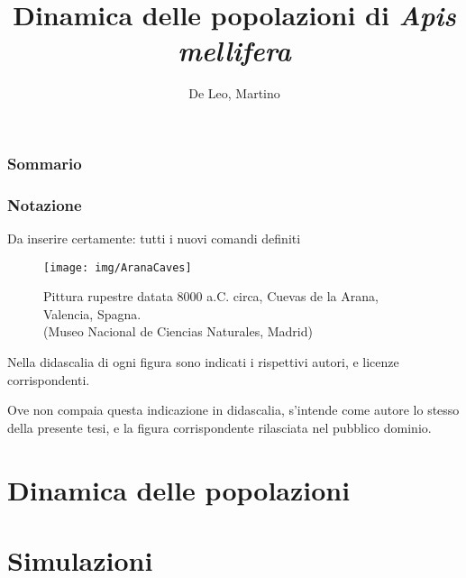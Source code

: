 \documentclass[12pt,a4paper,oneside,hidelinks]{book} %
\author{De Leo, Martino}
\title{Dinamica delle popolazioni di \emph{Apis mellifera} }
\begin{document}
\maketitle %

\frontmatter

\section*{Sommario}


\section*{Notazione}
Da inserire certamente: tutti i nuovi comandi definiti

\begin{figure}[hbp]
    \centering
    \texttt{[image: img/AranaCaves]}

    \caption[Pittura rupestre di Arana.]{Pittura rupestre datata 8000 a.C. circa, Cuevas de la Arana, Valencia, Spagna. \\ (Museo Nacional de Ciencias Naturales, Madrid)}
    \label{img:arana}
\end{figure}

\cleardoublepage
\tableofcontents

\listoffigures
Nella didascalia di ogni figura sono indicati i rispettivi autori, e licenze corrispondenti.

Ove non compaia questa indicazione in didascalia, s'intende come autore lo stesso della presente tesi, e la figura
corrispondente rilasciata nel pubblico dominio.

\listoftables


\mainmatter

\clearpage
\part{Dinamica delle popolazioni}







\part{Simulazioni}







\appendix



\backmatter



\cleardoublepage
{}
\nocite{*} %
\printbibliography
\end{document}
